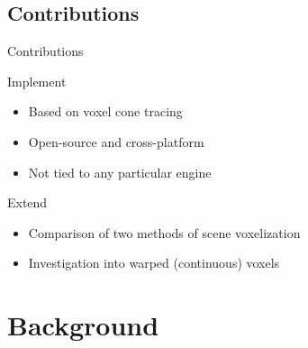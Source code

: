 \documentclass[10pt]{beamer}
\begin{document}
\subsection{Contributions}
\begin{frame}{Contributions}
  \begin{block}{Implement}
    \begin{itemize}
      \item Based on voxel cone tracing
      \item Open-source and cross-platform
      \item Not tied to any particular engine
    \end{itemize}
  \end{block}

  \begin{block}{Extend}
    \begin{itemize}
      \item Comparison of two methods of scene voxelization
      \item Investigation into warped (continuous) voxels
    \end{itemize}
  \end{block}

\end{frame}

\section{Background}

\end{document}
